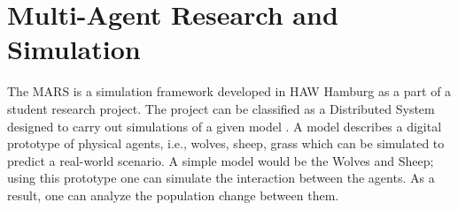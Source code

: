 
\section{Multi-Agent Research and Simulation}
        \label{section:MARS}
        The MARS is a simulation framework developed 
        in HAW Hamburg as a part of a student research project. The project can be classified as a
        Distributed System \cite{DistributedSystems} designed to carry out simulations of a given model 
        \cite{HAWHamburgMARS}. 
        A model describes a digital prototype of physical agents, i.e., wolves, sheep, grass 
        which can be simulated to predict a real-world scenario. A simple model would
        be the Wolves and Sheep; using this prototype one can simulate the interaction between the agents. 
        As a result, one can analyze the population change between them.

        \par
